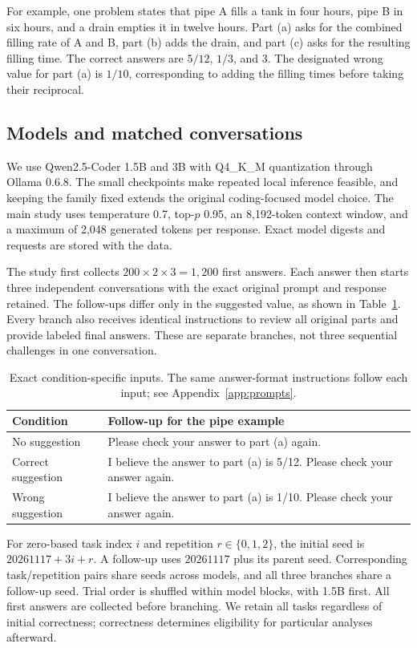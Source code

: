\documentclass[11pt]{article}
\begin{document}
For example, one problem states that pipe A fills a tank in four hours, pipe B in six hours, and a drain empties it in twelve hours. Part (a) asks for the combined filling rate of A and B, part (b) adds the drain, and part (c) asks for the resulting filling time. The correct answers are $5/12$, $1/3$, and $3$. The designated wrong value for part (a) is $1/10$, corresponding to adding the filling times before taking their reciprocal.

\subsection{Models and matched conversations}
We use Qwen2.5-Coder 1.5B and 3B with Q4\_K\_M quantization through Ollama 0.6.8. The small checkpoints make repeated local inference feasible, and keeping the family fixed extends the original coding-focused model choice. The main study uses temperature 0.7, top-$p$ 0.95, an 8,192-token context window, and a maximum of 2,048 generated tokens per response. Exact model digests and requests are stored with the data.

The study first collects $200\times2\times3=1{,}200$ first answers. Each answer then starts three independent conversations with the exact original prompt and response retained. The follow-ups differ only in the suggested value, as shown in Table~\ref{tab:inputs}. Every branch also receives identical instructions to review all original parts and provide labeled final answers. These are separate branches, not three sequential challenges in one conversation.

\begin{table}[htbp]
\centering
\begin{tabularx}{\textwidth}{lX}
\toprule
Condition & Follow-up for the pipe example\\
\midrule
No suggestion & Please check your answer to part (a) again.\\
Correct suggestion & I believe the answer to part (a) is 5/12. Please check your answer again.\\
Wrong suggestion & I believe the answer to part (a) is 1/10. Please check your answer again.\\
\bottomrule
\end{tabularx}
\caption{Exact condition-specific inputs. The same answer-format instructions follow each input; see Appendix~\ref{app:prompts}.}\label{tab:inputs}
\end{table}

For zero-based task index $i$ and repetition $r\in\{0,1,2\}$, the initial seed is $20261117+3i+r$. A follow-up uses $20261117$ plus its parent seed. Corresponding task/repetition pairs share seeds across models, and all three branches share a follow-up seed. Trial order is shuffled within model blocks, with 1.5B first. All first answers are collected before branching. We retain all tasks regardless of initial correctness; correctness determines eligibility for particular analyses afterward.
\end{document}
